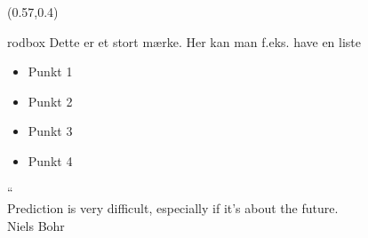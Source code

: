 \documentclass[t,24pt]{beamer}
\begin{document}
{
\begin{frame}[billede]
    \begin{textblock*}{\textwidth}(0.57\textwidth,0.4\textheight)
        \begin{beamercolorbox}[wd=6.4cm,sep=0.3cm]{rodbox}
            Dette er et stort mærke. Her kan man f.eks. have en liste
            \begin{itemize}
                \item Punkt 1
                \item Punkt 2
                \item Punkt 3
                \item Punkt 4
            \end{itemize}
        \end{beamercolorbox}
    \end{textblock*}
\end{frame}
}

\begin{frame}[rod]
    \fontsize{80}{0}\selectfont ``
    \\
    \vspace{-0.6cm}
    \fontsize{32}{0}\selectfont Prediction is very difficult, especially if it's about the future.
    \\
    \vspace{2.8cm}
    \fontsize{18}{0}\selectfont Niels Bohr
\end{frame}

\begin{frame}[rod]
    \vspace{0.9cm}
\end{frame}
\end{document}
